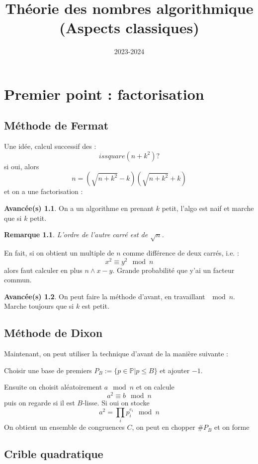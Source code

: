\documentclass[a4paper,12pt]{book}
\title{Théorie des nombres algorithmique\\ \small{(Aspects classiques)}}
\date{2023-2024}
\theoremstyle{plain}
\newtheorem{rem}{Remarque}
\theoremstyle{definition}
\newtheorem{avanc}{Avancée(s)}
\theoremstyle{remark}
\begin{document}
\maketitle
\tableofcontents
\chapter{Premier point : factorisation}
\section{Méthode de Fermat}
Une idée, calcul successif des : 
\[issquare(n+k^2)?\]
si oui, alors \[n=(\sqrt{n+k^2}-k)(\sqrt{n+k^2}+k)\]
et on a une factorisation :
\begin{avanc}
    On a un algorithme en prenant $k$ petit, l'algo est
    naif et marche que si $k$ petit.
\end{avanc}
\begin{rem}
    L'ordre de l'autre carré est de $\sqrt n$.
\end{rem}

En fait, si on obtient un multiple de $n$ comme différence de 
deux carrés, i.e. :
\[x^2\equiv y^2\mod n\]
alors faut calculer en plus $n\wedge x-y$. Grande probabilité
que y'ai un facteur commun.
\begin{avanc}
    On peut faire la méthode d'avant, en travaillant $\mod n$.
    Marche toujours que si $k$ est petit.
\end{avanc}

\section{Méthode de Dixon}
Maintenant, on peut utiliser la technique d'avant de la manière
suivante :
\begin{center}
    Choisir une base de premiers $P_B:=\{p\in\mathbb P|p\leq B\}$
    et ajouter $-1$.
\end{center}
Ensuite on choisit aléatoirement $a\mod n$ et on calcule
\[a^2\equiv b\mod n\]
puis on regarde si il est $B$-lisse. Si oui on stocke 
\[a^2=\prod_i p_i^{e_i}\mod n\]
On obtient un ensemble de congruences $C$, on peut en chopper
$\# P_B$ et on forme 

\section{Crible quadratique}







\printbibliography
\end{document}
